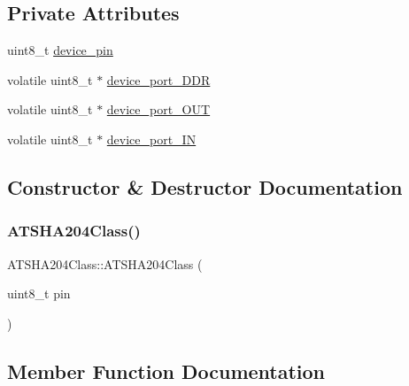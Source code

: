 \subsection*{Private Attributes}
\begin{DoxyCompactItemize}
\item 
uint8\+\_\+t \hyperlink{classATSHA204Class_af0ab12881adf592031ce4e272fd06d3b}{device\+\_\+pin}
\item 
volatile uint8\+\_\+t $\ast$ \hyperlink{classATSHA204Class_a122693bbcf51517cc0362f1c0ddfaa39}{device\+\_\+port\+\_\+\+D\+DR}
\item 
volatile uint8\+\_\+t $\ast$ \hyperlink{classATSHA204Class_a5a6c964a1ab185c22bf9d1a50e29dcab}{device\+\_\+port\+\_\+\+O\+UT}
\item 
volatile uint8\+\_\+t $\ast$ \hyperlink{classATSHA204Class_aaf7cad7ce8ea007c5e73548a3c335385}{device\+\_\+port\+\_\+\+IN}
\end{DoxyCompactItemize}


\subsection{Constructor \& Destructor Documentation}
\mbox{\label{classATSHA204Class_ac2d1196f44961ce709be1f8bf59c162b}} 
\subsubsection{\texorpdfstring{A\+T\+S\+H\+A204\+Class()}{ATSHA204Class()}}
{\footnotesize\ttfamily A\+T\+S\+H\+A204\+Class\+::\+A\+T\+S\+H\+A204\+Class (\begin{DoxyParamCaption}\item[{uint8\+\_\+t}]{pin }\end{DoxyParamCaption})}



\subsection{Member Function Documentation}
\mbox{\label{classATSHA204Class_ade50092ec236d13cde64e7684b59ab7b}} 
